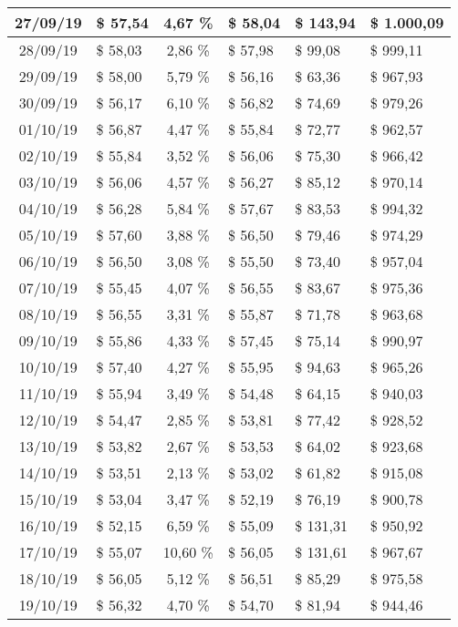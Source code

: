 \begin{center}
\begin{small}
\begin{longtable}{|c|l|c|l|l|l|}
27/09/19 & \$ 57,54 & 4,67 \% & \$ 58,04 & \$ 143,94 & \$ 1.000,09 \\ \hline
28/09/19 & \$ 58,03 & 2,86 \% & \$ 57,98 & \$ 99,08 & \$ 999,11 \\ \hline
29/09/19 & \$ 58,00 & 5,79 \% & \$ 56,16 & \$ 63,36 & \$ 967,93 \\ \hline
30/09/19 & \$ 56,17 & 6,10 \% & \$ 56,82 & \$ 74,69 & \$ 979,26 \\ \hline
01/10/19 & \$ 56,87 & 4,47 \% & \$ 55,84 & \$ 72,77 & \$ 962,57 \\ \hline
02/10/19 & \$ 55,84 & 3,52 \% & \$ 56,06 & \$ 75,30 & \$ 966,42 \\ \hline
03/10/19 & \$ 56,06 & 4,57 \% & \$ 56,27 & \$ 85,12 & \$ 970,14 \\ \hline
04/10/19 & \$ 56,28 & 5,84 \% & \$ 57,67 & \$ 83,53 & \$ 994,32 \\ \hline
05/10/19 & \$ 57,60 & 3,88 \% & \$ 56,50 & \$ 79,46 & \$ 974,29 \\ \hline
06/10/19 & \$ 56,50 & 3,08 \% & \$ 55,50 & \$ 73,40 & \$ 957,04 \\ \hline
07/10/19 & \$ 55,45 & 4,07 \% & \$ 56,55 & \$ 83,67 & \$ 975,36 \\ \hline
08/10/19 & \$ 56,55 & 3,31 \% & \$ 55,87 & \$ 71,78 & \$ 963,68 \\ \hline
09/10/19 & \$ 55,86 & 4,33 \% & \$ 57,45 & \$ 75,14 & \$ 990,97 \\ \hline
10/10/19 & \$ 57,40 & 4,27 \% & \$ 55,95 & \$ 94,63 & \$ 965,26 \\ \hline
11/10/19 & \$ 55,94 & 3,49 \% & \$ 54,48 & \$ 64,15 & \$ 940,03 \\ \hline
12/10/19 & \$ 54,47 & 2,85 \% & \$ 53,81 & \$ 77,42 & \$ 928,52 \\ \hline
13/10/19 & \$ 53,82 & 2,67 \% & \$ 53,53 & \$ 64,02 & \$ 923,68 \\ \hline
14/10/19 & \$ 53,51 & 2,13 \% & \$ 53,02 & \$ 61,82 & \$ 915,08 \\ \hline
15/10/19 & \$ 53,04 & 3,47 \% & \$ 52,19 & \$ 76,19 & \$ 900,78 \\ \hline
16/10/19 & \$ 52,15 & 6,59 \% & \$ 55,09 & \$ 131,31 & \$ 950,92 \\ \hline
17/10/19 & \$ 55,07 & 10,60 \% & \$ 56,05 & \$ 131,61 & \$ 967,67 \\ \hline
18/10/19 & \$ 56,05 & 5,12 \% & \$ 56,51 & \$ 85,29 & \$ 975,58 \\ \hline
19/10/19 & \$ 56,32 & 4,70 \% & \$ 54,70 & \$ 81,94 & \$ 944,46 \\ \hline

\end{longtable}
\end{small}
\end{center}
